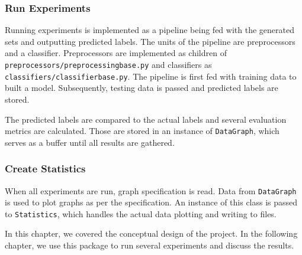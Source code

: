 \subsubsection{Run Experiments}

Running experiments is implemented as a pipeline being fed with the generated sets and outputting predicted labels.
The units of the pipeline are preprocessors and a classifier.
Preprocessors are implemented as children of \texttt{preprocessors/preprocessingbase.py} and classifiers
as \texttt{classifiers/classifierbase.py}.
The pipeline is first fed with training data to built a model.
Subsequently, testing data is passed and predicted labels are stored.

The predicted labels are compared to the actual labels and several evaluation metrics are calculated.
Those are stored in an instance of \texttt{DataGraph}, which serves as a buffer until all results are gathered.

\subsubsection{Create Statistics}

When all experiments are run, graph specification is read.
Data from \texttt{DataGraph} is used to plot graphs as per the specification.
An instance of this class is passed to \texttt{Statistics},
which handles the actual data plotting and writing to files.

In this chapter, we covered the conceptual design of the project.
In the following chapter, we use this package to run several experiments and discuss the results.

